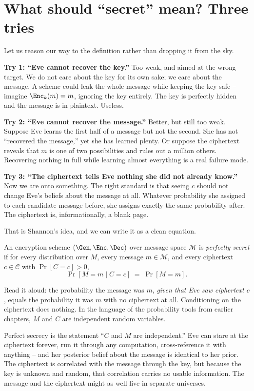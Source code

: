 \section{What should ``secret'' mean? Three tries}
\label{ch09:three-tries}

Let us reason our way to the definition rather than dropping it from the sky.

\textbf{Try 1: ``Eve cannot recover the key.''} Too weak, and aimed at the wrong target. We do not care about the key for its own sake; we care about the message. A scheme could leak the whole message while keeping the key safe -- imagine $\Enc_k(m) = m$, ignoring the key entirely. The key is perfectly hidden and the message is in plaintext. Useless.

\textbf{Try 2: ``Eve cannot recover the message.''} Better, but still too weak. Suppose Eve learns the first half of a message but not the second. She has not ``recovered the message,'' yet she has learned plenty. Or suppose the ciphertext reveals that $m$ is one of two possibilities and rules out a million others. Recovering nothing in full while learning almost everything is a real failure mode.

\textbf{Try 3: ``The ciphertext tells Eve nothing she did not already know.''} Now we are onto something. The right standard is that seeing $c$ should not change Eve's beliefs about the message at all. Whatever probability she assigned to each candidate message before, she assigns exactly the same probability after. The ciphertext is, informationally, a blank page.

That is Shannon's idea, and we can write it as a clean equation.

\begin{definition}
\label{ch09:perfect-def}
An encryption scheme $(\Gen,\Enc,\Dec)$ over message space $\mathcal{M}$ is \emph{perfectly secret} if for every distribution over $M$, every message $m \in \mathcal{M}$, and every ciphertext $c \in \mathcal{C}$ with $\Pr[C = c] > 0$,
\[
  \Pr[M = m \mid C = c] \;=\; \Pr[M = m].
\]
\end{definition}

Read it aloud: the probability the message was $m$, \emph{given that Eve saw ciphertext $c$}, equals the probability it was $m$ with no ciphertext at all. Conditioning on the ciphertext does nothing. In the language of the probability tools from earlier chapters, $M$ and $C$ are independent random variables.

\begin{intuitionbox}
Perfect secrecy is the statement ``$C$ and $M$ are independent.'' Eve can stare at the ciphertext forever, run it through any computation, cross-reference it with anything -- and her posterior belief about the message is identical to her prior. The ciphertext is correlated with the message through the key, but because the key is unknown and random, that correlation carries no usable information. The message and the ciphertext might as well live in separate universes.
\end{intuitionbox}

